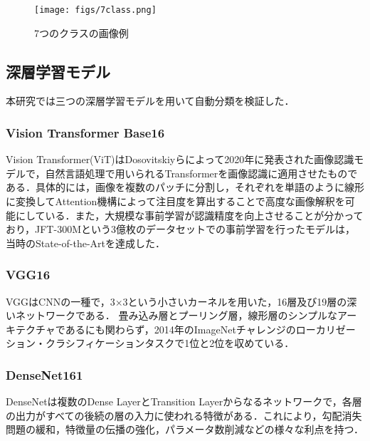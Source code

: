 \documentclass[technicalreport]{ieicej}
\begin{document}
\begin{figure}[t]
\begin{center}
\capwidth=60mm
\vspace{70mm}
\centering\hspace{-5cm}
\texttt{[image: figs/7class.png]}
\caption{7つのクラスの画像例}
\label{fig:ex}
\end{center}
\end{figure}

\subsection{深層学習モデル}
本研究では三つの深層学習モデルを用いて自動分類を検証した．
\subsubsection{Vision Transformer Base16}
Vision Transformer(ViT)\cite{dosovitskiy2020image}はDosovitskiyらによって2020年に発表された画像認識モデルで，自然言語処理で用いられるTransformer\cite{vaswani2017attention}を画像認識に適用させたものである．具体的には，画像を複数のパッチに分割し，それぞれを単語のように線形に変換してAttention機構によって注目度を算出することで高度な画像解釈を可能にしている．また，大規模な事前学習が認識精度を向上させることが分かっており，JFT-300Mという3億枚のデータセットでの事前学習を行ったモデルは，当時のState-of-the-Artを達成した．

\subsubsection{VGG16}
VGG\cite{simonyan2014very}はCNNの一種で，3×3という小さいカーネルを用いた，16層及び19層の深いネットワークである．
畳み込み層とプーリング層，線形層のシンプルなアーキテクチャであるにも関わらず，2014年のImageNetチャレンジのローカリゼーション・クラシフィケーションタスクで1位と2位を収めている．

\subsubsection{DenseNet161}
DenseNet\cite{huang2017densely}は複数のDense LayerとTransition Layerからなるネットワークで，各層の出力がすべての後続の層の入力に使われる特徴がある．これにより，勾配消失問題の緩和，特徴量の伝播の強化，パラメータ数削減などの様々な利点を持つ．
\end{document}
